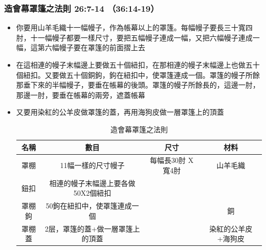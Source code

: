 \subsubsection{造會幕罩篷之法則 26:7-14 （36:14-19）}
\begin{itemize} 
\itemsep-.35em
\item 你要用山羊毛織十一幅幔子，作為帳幕以上的罩篷。每幅幔子要長三十寬四肘，十一幅幔子都要一樣尺寸，要把五幅幔子連成一幅，又把六幅幔子連成一幅，這第六幅幔子要在罩篷的前面摺上去
\item 在這相連的幔子末幅邊上要做五十個紐扣，在那相連的幔子末幅邊上也做五十個紐扣。又要做五十個銅鉤，鉤在紐扣中，使罩篷連成一個。罩篷的幔子所餘那垂下來的半幅幔子，要垂在帳幕的後頭。罩篷的幔子所餘長的，這邊一肘，那邊一肘，要垂在帳幕的兩旁，遮蓋帳幕
\item 又要用染紅的公羊皮做罩篷的蓋，再用海狗皮做一層罩篷上的頂蓋
\begin{table}[H]
\centering
\begin{tabular}{|c|c|c|c| }
\hline
\hline
名稱   & 數目& 尺寸     & 材料  \\\hline
罩棚& 11幅一樣的尺寸幔子     &每幅長30肘 X 寬4肘&山羊毛織\\\hline
鈕扣& 相連的幔子末幅邊上要各做50X2個紐扣     & & \\\hline
罩棚鉤& 50鉤在紐扣中，使罩篷連成一個     & &銅\\\hline
罩棚蓋&2层，罩篷的蓋+做一層罩篷上的頂蓋       & &染紅的公羊皮+海狗皮\\\hline
\end{tabular}
\caption{造會幕罩篷之法則}
\end{table}
\end{itemize}

